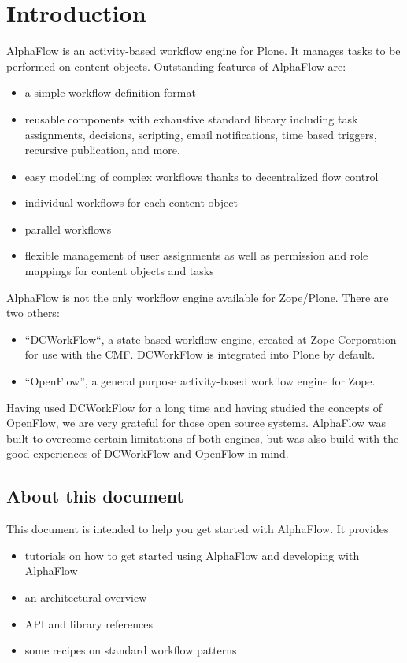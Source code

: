 \chapter{Introduction}

AlphaFlow is an activity-based workflow engine for Plone. It manages tasks to
be performed on content objects. Outstanding features of AlphaFlow are:
\begin{itemize}
    \item a simple workflow definition format
    \item reusable components with exhaustive standard library including
        task assignments, decisions, scripting, email notifications, time based triggers, recursive publication, and more.
    \item easy modelling of complex workflows thanks to decentralized flow
      control
    \item individual workflows for each content object
    \item parallel workflows
    \item flexible management of user assignments as well as permission and
      role mappings for content objects and tasks
\end{itemize}

AlphaFlow is not the only workflow engine available for Zope/Plone. There are two
others:
\begin{itemize}
\item ``DCWorkFlow``, a state-based workflow engine, created at Zope Corporation for use with the CMF.
    DCWorkFlow is integrated into Plone by default.
\item ``OpenFlow'', a general purpose activity-based workflow engine for Zope.
\end{itemize}

Having used DCWorkFlow for a long time and having studied the concepts of
OpenFlow, we are very grateful for those open source systems. AlphaFlow was
built to overcome certain limitations of both engines, but was also build with
the good experiences of DCWorkFlow and OpenFlow in mind.

\section{About this document}

This document is intended to help you get started with AlphaFlow.  It provides
\begin{itemize}
    \item tutorials on how to get started using AlphaFlow and developing with AlphaFlow
    \item an architectural overview
    \item API and library references 
    \item some recipes on standard workflow patterns
\end{itemize}


